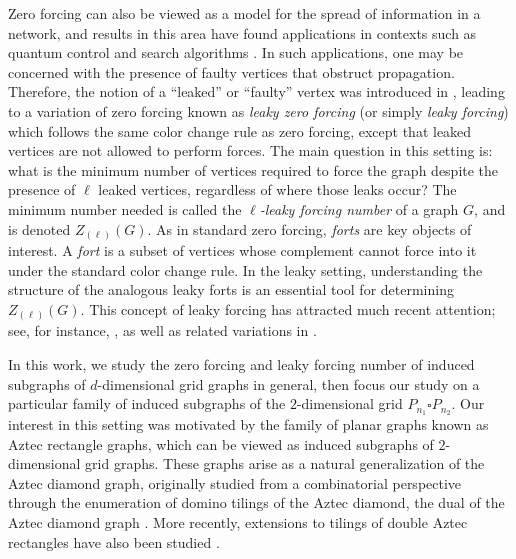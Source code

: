 \documentclass[11pt]{article}
\theoremstyle{plain} \newtheorem{question}{Question}
\theoremstyle{definition}
\begin{document}
Zero forcing can also be viewed as a model for the spread of information in a network, and results in this area have found applications in contexts such as quantum control \cite{QuantumControl} and search algorithms \cite{SearchTrees}. In such applications, one may be concerned with the presence of faulty vertices that obstruct propagation. Therefore, the notion of a ``leaked'' or ``faulty'' vertex was introduced in \cite{KenterOGpaper}, leading to a variation of zero forcing known as \emph{leaky zero forcing} (or simply \emph{leaky forcing}) which follows the same color change rule as zero forcing, except that leaked vertices are not allowed to perform forces. The main question in this setting is: what is the minimum number of vertices required to force the graph despite the presence of $\ell$ leaked vertices, regardless of where those leaks occur? The minimum number needed is called the \emph{$\ell$-leaky forcing number} of a graph $G$, and is denoted $Z_{(\ell)}(G)$. As in standard zero forcing, \textit{forts} are key objects of interest. A \emph{fort} is a subset of vertices whose complement cannot force into it under the standard color change rule. In the leaky setting, understanding the structure of the analogous leaky forts is an essential tool for determining $Z_{(\ell)}(G)$. This concept of leaky forcing has attracted much recent attention; see, for instance, \cite{KenterOGpaper,Reslience,GeneralLeaky,herrman2024leakyforcingresiliencecartesian,QdLeaky}, as well as related variations in \cite{elias2024leakypositivesemidefiniteforcing}.

In this work, we study the zero forcing and leaky forcing number of induced subgraphs of $d$-dimensional grid graphs in general, then focus our study on a particular family of induced subgraphs of the $2$-dimensional grid $P_{n_1}\square P_{n_2}$. Our interest in this setting was motivated by the family of planar graphs known as Aztec rectangle graphs, which can be viewed as induced subgraphs of $2$-dimensional grid graphs. These graphs arise as a natural generalization of the Aztec diamond graph, originally studied from a combinatorial perspective through the enumeration of domino tilings of the Aztec diamond, the dual of the Aztec diamond graph \cite{FirstMentionAD,AztecDiamondGraphs-Benkart}. More recently, extensions to tilings of double Aztec rectangles have also been studied \cite{DoubleAztecRect}.
\end{document}
